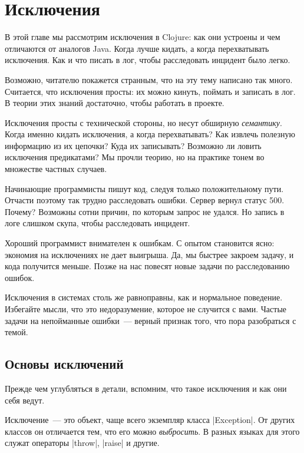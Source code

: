 \chapter{Исключения}

\begin{teaser}
В этой главе мы рассмотрим исключения в Clojure: как они устроены и чем
отличаются от аналогов Java. Когда лучше кидать, а когда перехватывать
исключения. Как и что писать в лог, чтобы расследовать инцидент было легко.
\end{teaser}

Возможно, читателю покажется странным, что на эту тему написано так
много. Считается, что исключения просты: их можно кинуть, поймать и записать в
лог. В теории этих знаний достаточно, чтобы работать в проекте.

Исключения просты с технической стороны, но несут обширную
\emph{семантику}. Когда именно кидать исключения, а когда перехватывать? Как
извлечь полезную информацию из их цепочки? Куда их записывать? Возможно ли
ловить исключения предикатами? Мы прочли теорию, но на практике тонем во
множестве частных случаев.

Начинающие программисты пишут код, следуя только положительному пути. Отчасти
поэтому так трудно расследовать ошибки. Сервер вернул статус 500. Почему?
Возможны сотни причин, по которым запрос не удался. Но запись в логе слишком
скупа, чтобы расследовать инцидент.

Хороший программист внимателен к ошибкам. С опытом становится ясно: экономия на
исключениях не дает выигрыша. Да, мы быстрее закроем задачу, и кода получится
меньше. Позже на нас повесят новые задачи по расследованию ошибок.

Исключения в системах столь же равноправны, как и нормальное поведение. Избегайте
мысли, что это недоразумение, которое не случится с вами. Частые задачи на
непойманные ошибки~--- верный признак того, что пора разобраться с темой.

\section{Основы исключений}

Прежде чем углубляться в детали, вспомним, что такое исключения и как они себя
ведут.

Исключение~--- это объект, чаще всего экземпляр класса \spverb|Exception|. От
других классов он отличается тем, что его можно \emph{выбросить}. В разных
языках для этого служат операторы \spverb|throw|, \spverb|raise| и другие.


